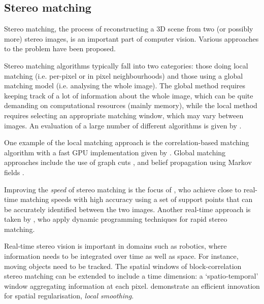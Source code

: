 \subsection{Stereo matching}
\label{sec:stereo-prior}

Stereo matching, the process of reconstructing a 3D scene from two (or possibly more) stereo
images, is an important part of computer vision. Various approaches to the
problem have been proposed.

Stereo matching algorithms typically fall into two categories: those doing local
matching (i.e. per-pixel or in pixel neighbourhoods) and those using a global
matching model (i.e. analysing the whole image). The global method requires
keeping track of a lot of information about the whole image, which can be quite
demanding on computational resources (mainly memory), while the local method
requires selecting an appropriate matching window, which may vary between
images. An evaluation of a large number of different algorithms is given by
\citet{stereocorrespondence}.

One example of the local matching approach is the correlation-based matching
algorithm with a fast GPU implementation given by \citet{weber09}. Global
matching approaches include the use of graph cuts
\cite{kolmogorov01:_comput}, and belief propagation using Markov fields
\cite{felzenszwalb06:_effic_belief_propag_early_vision}.

Improving the \emph{speed} of stereo matching is the focus of
\citet{geiger11:_effic_large_scale_stereo_match}, who achieve close to real-time
matching speeds with high accuracy using a set of support points that can be
accurately identified between the two images. Another real-time approach is taken
by \citet{realtimestereo}, who apply dynamic programming techniques for rapid stereo matching.

Real-time stereo vision is important in domains such as robotics, where information needs to be integrated over time as well as space. For instance, moving objects need to be tracked. The spatial windows of block-correlation stereo matching can be extended to include a time dimension: a `spatio-temporal' window aggregating information at each pixel. \citet{tombari_konolige} demonstrate an efficient innovation for spatial regularisation, \emph{local smoothing}.
